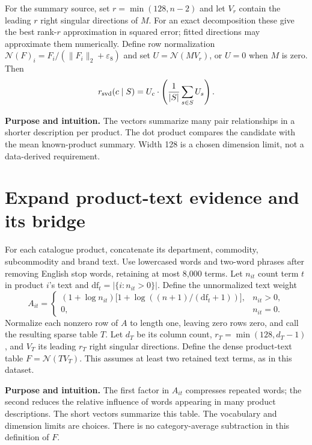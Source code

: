 \documentclass[11pt,a4paper]{article}
\newcommand{\N}{\mathcal N}\newcommand{\sd}{\operatorname{sd}}
\newcommand{\why}{\par\textbf{Purpose and intuition.} }
\numberwithin{equation}{section}
\begin{document}
For the summary source, set $r=\min(128,n-2)$ and let $V_r$ contain the leading $r$ right
singular directions of $M$. For an exact decomposition these give the best rank-$r$
approximation in squared error; fitted directions may approximate them numerically.
Define row normalization $\N(F)_i=F_i/(\lVert F_i\rVert_2+\varepsilon_8)$ and set
$U=\N(MV_r)$, or $U=0$ when $M$ is zero. Then
\begin{equation}
r_{\rm svd}(c\mid S)=U_c\cdot\left(\frac1{|S|}\sum_{s\in S}U_s\right).
\end{equation}
\why The vectors summarize many pair relationships in a shorter description per product.
The dot product compares the candidate with the mean known-product summary. Width 128 is
a chosen dimension limit, not a data-derived requirement.

\section{Expand product-text evidence and its bridge}\label{text}
For each catalogue product, concatenate its department, commodity, subcommodity and brand
text. Use lowercased words and two-word phrases after removing English stop words, retaining
at most 8,000 terms. Let $n_{it}$ count term $t$ in product $i$'s text and
$\mathrm{df}_t=|\{i:n_{it}>0\}|$. Define the unnormalized text weight
\begin{equation}
A_{it}=\begin{cases}
(1+\log n_{it})\bigl[1+\log((n+1)/(\mathrm{df}_t+1))\bigr],&n_{it}>0,\\
0,&n_{it}=0.
\end{cases}
\end{equation}
Normalize each nonzero row of $A$ to length one, leaving zero rows zero, and call the
resulting sparse table $T$. Let $d_T$ be its column count, $r_T=\min(128,d_T-1)$, and
$V_T$ its leading $r_T$ right singular directions. Define the dense product-text table
$F=\N(TV_T)$. This assumes at least two retained text terms, as in this dataset.
\why The first factor in $A_{it}$ compresses repeated words; the second reduces the
relative influence of words appearing in many product descriptions. The short vectors
summarize this table. The vocabulary and dimension limits are choices. There is no
category-average subtraction in this definition of $F$.
\end{document}

